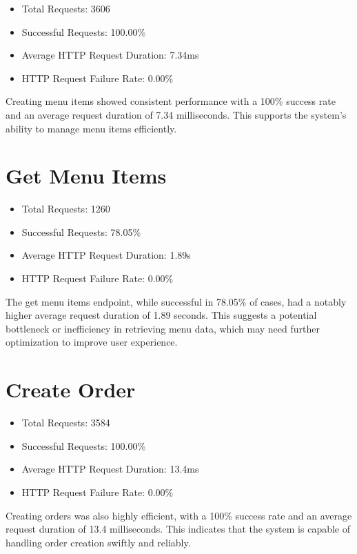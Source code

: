 \documentclass{article}
\begin{document}
\begin{itemize}
  \item Total Requests: 3606
  \item Successful Requests: 100.00\%
  \item Average HTTP Request Duration: 7.34ms
  \item HTTP Request Failure Rate: 0.00\%
\end{itemize}

Creating menu items showed consistent performance with a 100\% success rate and an average request duration of 7.34 milliseconds. This supports the system's ability to manage menu items efficiently.

\section{Get Menu Items}

\begin{itemize}
  \item Total Requests: 1260
  \item Successful Requests: 78.05\%
  \item Average HTTP Request Duration: 1.89s
  \item HTTP Request Failure Rate: 0.00\%
\end{itemize}

The get menu items endpoint, while successful in 78.05\% of cases, had a notably higher average request duration of 1.89 seconds. This suggests a potential bottleneck or inefficiency in retrieving menu data, which may need further optimization to improve user experience.

\section{Create Order}

\begin{itemize}
  \item Total Requests: 3584
  \item Successful Requests: 100.00\%
  \item Average HTTP Request Duration: 13.4ms
  \item HTTP Request Failure Rate: 0.00\%
\end{itemize}

Creating orders was also highly efficient, with a 100\% success rate and an average request duration of 13.4 milliseconds. This indicates that the system is capable of handling order creation swiftly and reliably.
\end{document}
